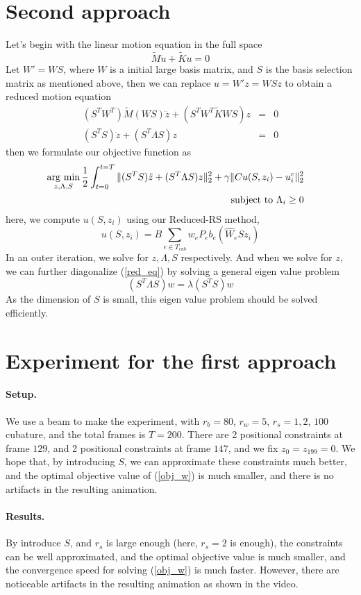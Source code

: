 \documentclass[9pt,twocolumn]{extarticle}
\newcommand{\argmin}{\operatornamewithlimits{arg\ min}}
\begin{document}
\section{Second approach}
Let's begin with the linear motion equation in the full space
\begin{equation} \label{full_eq}
  \tilde{M}\ddot{u} + \tilde{K}u = 0
\end{equation}
Let $W'=WS$, where $W$ is a initial large basis matrix, and $S$ is the basis
selection matrix as mentioned above, then we can replace $u=W'z = WSz$ to obtain
a reduced motion equation
\begin{eqnarray}\label{red_eq}
  (S^TW^T)\tilde{M}(WS)\ddot{z} + (S^TW^T\tilde{K}WS)z &=& 0\\
  (S^TS)\ddot{z} + (S^T\Lambda S)z &=& 0
\end{eqnarray}
then we formulate our objective function as
\begin{eqnarray} \label{obj_w2}
  \argmin_{z,\Lambda,S}\frac{1}{2}\int_{t=0}^{t=T}\|(S^TS)\ddot{z} +
  (S^T\Lambda S)z\|_2^2+\gamma\|Cu(S,z_i)-u_i^c\|_2^2&&\\
  \mbox{subject to } \Lambda_i\ge 0&&
\end{eqnarray}
here, we compute $u(S,z_i)$ using our Reduced-RS method,
\begin{equation} \label{redrs_s}
  u(S,z_i) = B\sum_{e\in T_{cub}}w_eP_eb_e(\hat{W}_eSz_i)
\end{equation}
In an outer iteration, we solve for $z,\Lambda,S$ respectively. And when we
solve for $z$, we can further diagonalize (\ref{red_eq}) by solving a general
eigen value problem
\begin{equation} \label{red_general}
  (S^T\Lambda S)w = \lambda (S^TS)w
\end{equation}
As the dimension of $S$ is small, this eigen value problem should be solved
efficiently.

\section{Experiment for the first approach}
\paragraph{Setup.} We use a beam to make the experiment, with $r_b=80$, $r_w=5$,
$r_s=1,2$, $100$ cubature, and the total frames is $T=200$. There are 2
positional constraints at frame $129$, and 2 positional constraints at frame
$147$, and we fix $z_0=z_{199}=0$. We hope that, by introducing $S$, we can
approximate these constraints much better, and the optimal objective value of
(\ref{obj_w}) is much smaller, and there is no artifacts in the resulting
animation.

\paragraph{Results.} By introduce $S$, and $r_s$ is large enough (here, $r_s=2$
is enough), the constraints can be well approximated, and the optimal objective
value is much smaller, and the convergence speed for solving (\ref{obj_w}) is
much faster. However, there are noticeable artifacts in the resulting
animation as shown in the video.
\end{document}
